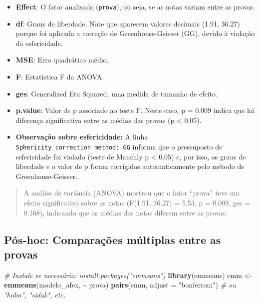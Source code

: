 \documentclass[
]{book}
\newenvironment{Shaded}{\begin{snugshade}}{\end{snugshade}}
\newcommand{\AttributeTok}[1]{\textcolor[rgb]{0.13,0.29,0.53}{#1}}
\newcommand{\CommentTok}[1]{\textcolor[rgb]{0.56,0.35,0.01}{\textit{#1}}}
\newcommand{\FunctionTok}[1]{\textcolor[rgb]{0.13,0.29,0.53}{\textbf{#1}}}
\newcommand{\NormalTok}[1]{#1}
\newcommand{\OtherTok}[1]{\textcolor[rgb]{0.56,0.35,0.01}{#1}}
\newcommand{\SpecialCharTok}[1]{\textcolor[rgb]{0.81,0.36,0.00}{\textbf{#1}}}
\newcommand{\StringTok}[1]{\textcolor[rgb]{0.31,0.60,0.02}{#1}}
\providecommand{\tightlist}{%
  \setlength{\itemsep}{0pt}\setlength{\parskip}{0pt}}
\begin{document}
\begin{itemize}
\tightlist
\item
  \textbf{Effect}: O fator analisado (\texttt{prova}), ou seja, se as notas variam entre as provas.
\item
  \textbf{df}: Graus de liberdade. Note que aparecem valores decimais (1.91, 36.27) porque foi aplicada a correção de Greenhouse-Geisser (GG), devido à violação da esfericidade.
\item
  \textbf{MSE}: Erro quadrático médio.
\item
  \textbf{F}: Estatística F da ANOVA.
\item
  \textbf{ges}: Generalized Eta Squared, uma medida de tamanho de efeito.
\item
  \textbf{p.value}: Valor de p associado ao teste F. Neste caso, p = 0.009 indica que há diferença significativa entre as médias das provas (p \textless{} 0.05).
\item
  \textbf{Observação sobre esfericidade:} A linha \texttt{Sphericity\ correction\ method:\ GG} informa que o pressuposto de esfericidade foi violado (teste de Mauchly p \textless{} 0.05) e, por isso, os graus de liberdade e o valor de p foram corrigidos automaticamente pelo método de Greenhouse-Geisser.
\end{itemize}

\begin{quote}
A análise de variância (ANOVA) mostrou que o fator ``prova'' teve um efeito significativo sobre as notas (F(1.91, 36.27) = 5.53, p = 0.009, ges = 0.168), indicando que as médias das notas diferem entre as provas.
\end{quote}

\subsection{Pós-hoc: Comparações múltiplas entre as provas}\label{puxf3s-hoc-comparauxe7uxf5es-muxfaltiplas-entre-as-provas}

\begin{Shaded}
\begin{Highlighting}[]
\CommentTok{\# Instale se necessário: install.packages("emmeans")}
\FunctionTok{library}\NormalTok{(emmeans)}
\NormalTok{emm }\OtherTok{\textless{}{-}} \FunctionTok{emmeans}\NormalTok{(modelo\_afex, }\SpecialCharTok{\textasciitilde{}}\NormalTok{ prova)}
\FunctionTok{pairs}\NormalTok{(emm, }\AttributeTok{adjust =} \StringTok{"bonferroni"}\NormalTok{) }\CommentTok{\# ou "holm", "sidak", etc.}
\end{Highlighting}
\end{Shaded}
\end{document}
